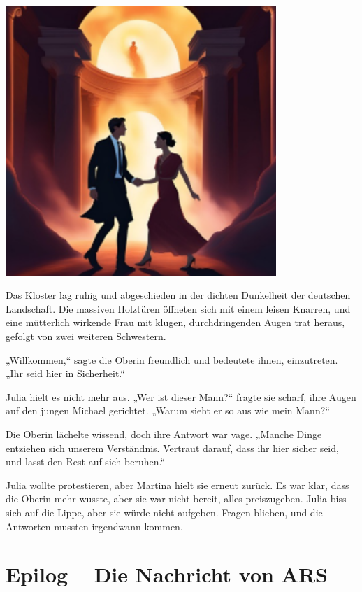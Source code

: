 \documentclass[
]{article}
\begin{document}
\includegraphics[width=4.04843in,height=4.01776in]{media/image8.png}

Das Kloster lag ruhig und abgeschieden in der dichten Dunkelheit der
deutschen Landschaft. Die massiven Holztüren öffneten sich mit einem
leisen Knarren, und eine mütterlich wirkende Frau mit klugen,
durchdringenden Augen trat heraus, gefolgt von zwei weiteren Schwestern.

„Willkommen,`` sagte die Oberin freundlich und bedeutete ihnen,
einzutreten. „Ihr seid hier in Sicherheit.``

Julia hielt es nicht mehr aus. „Wer ist dieser Mann?{\kern0pt}`` fragte
sie scharf, ihre Augen auf den jungen Michael gerichtet. „Warum sieht er
so aus wie mein Mann?{\kern0pt}``

Die Oberin lächelte wissend, doch ihre Antwort war vage. „Manche Dinge
entziehen sich unserem Verständnis. Vertraut darauf, dass ihr hier
sicher seid, und lasst den Rest auf sich beruhen.``

Julia wollte protestieren, aber Martina hielt sie erneut zurück. Es war
klar, dass die Oberin mehr wusste, aber sie war nicht bereit, alles
preiszugeben. Julia biss sich auf die Lippe, aber sie würde nicht
aufgeben. Fragen blieben, und die Antworten mussten irgendwann kommen.

\section{Epilog -- Die Nachricht von
ARS}\label{epilog-die-nachricht-von-ars}
\end{document}
